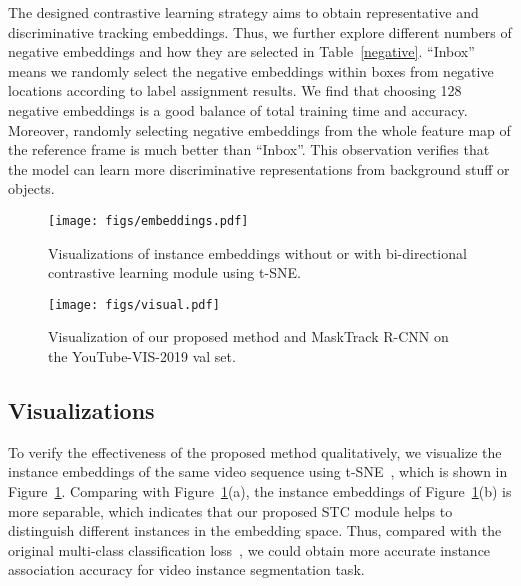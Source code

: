 \documentclass[runningheads]{llncs}
\begin{document}
 The designed contrastive learning strategy aims to obtain representative and discriminative tracking embeddings. Thus, we further explore different numbers of negative embeddings and how they are selected in Table~\ref{negative}. ``Inbox'' means we randomly select the negative embeddings within boxes from negative locations according to label assignment results. We find that choosing 128 negative embeddings is a good balance of total training time and accuracy. Moreover, randomly selecting negative embeddings from the whole feature map of the reference frame is much better than ``Inbox''. This observation verifies that the model can learn more discriminative representations from background stuff or objects. 

\begin{figure}[t!]
\centering
\texttt{[image: figs/embeddings.pdf]}
\caption{Visualizations of instance embeddings without or with bi-directional contrastive learning module using t-SNE.}
\label{embeddings}
\end{figure}


\begin{figure*}[t!]
\centering
\texttt{[image: figs/visual.pdf]}
\caption{Visualization of our proposed method and MaskTrack R-CNN on the YouTube-VIS-2019 val set.}
\label{visualizations}
\end{figure*}

\subsection{Visualizations}\label{sec:visualizations}
 To verify the effectiveness of the proposed method qualitatively, we visualize the instance embeddings of the same video sequence using t-SNE~\cite{van2008visualizing}, which is shown in Figure~\ref{embeddings}. Comparing with Figure~\ref{embeddings}(a), the instance embeddings of Figure~\ref{embeddings}(b) is more separable, which indicates that our proposed STC module helps to distinguish different instances in the embedding space. Thus, compared with the original multi-class classification loss~\cite{yang2019video}, we could obtain more accurate instance association accuracy for video instance segmentation task.
\end{document}
